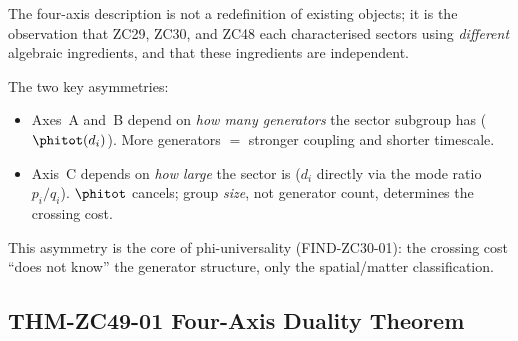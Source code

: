 \documentclass[12pt, a4paper]{article}
\begin{document}
\begin{derivedbox}[title={Commentary on LEM-ZC49-01}]
The four-axis description is not a redefinition of existing
objects; it is the observation that ZC29, ZC30, and ZC48 each
characterised sectors using \emph{different} algebraic
ingredients, and that these ingredients are independent.

The two key asymmetries:
\begin{itemize}[noitemsep, leftmargin=*]
  \item Axes~A and~B depend on \emph{how many generators}
    the sector subgroup has ($\phitot(d_i)$).
    More generators $=$ stronger coupling and shorter timescale.
  \item Axis~C depends on \emph{how large} the sector is
    ($d_i$ directly via the mode ratio $p_i/q_i$).
    $\phitot$ cancels; group \emph{size}, not generator count,
    determines the crossing cost.
\end{itemize}
This asymmetry is the core of phi-universality (FIND-ZC30-01):
the crossing cost ``does not know'' the generator structure,
only the spatial/matter classification.
\end{derivedbox}

\subsection{THM-ZC49-01 \quad Four-Axis Duality Theorem}
\label{sec:thm01}
\end{document}

